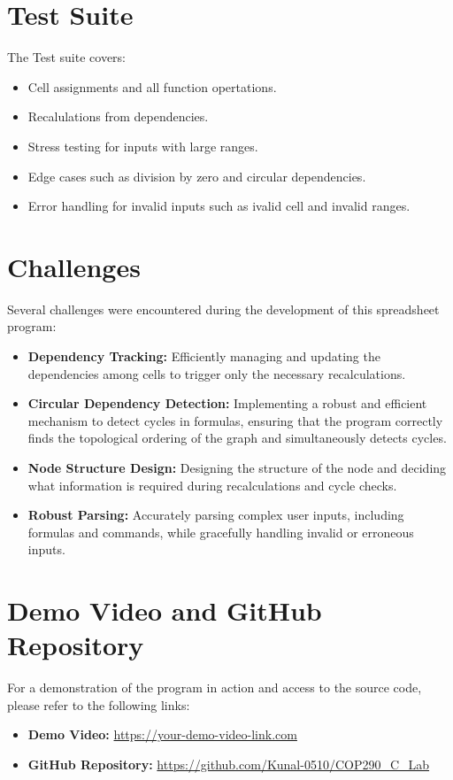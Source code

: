 \documentclass[a4paper,12pt,oneside]{article}
\begin{document}
\section{Test Suite}
The Test suite covers:
\begin{itemize}
    \item Cell assignments and all function opertations.
    \item Recalulations from dependencies.
    \item Stress testing for inputs with large ranges.
    \item Edge cases such as division by zero and circular dependencies.
    \item Error handling for invalid inputs such as ivalid cell and invalid ranges.
\end{itemize}


\section{Challenges}
Several challenges were encountered during the development of this spreadsheet program:
\begin{itemize}
    \item \textbf{Dependency Tracking:} Efficiently managing and updating the dependencies among cells to trigger only the necessary recalculations.
    \item \textbf{Circular Dependency Detection:} Implementing a robust and efficient mechanism to detect cycles in formulas, ensuring that the program correctly finds the topological ordering of the graph and simultaneously detects cycles.
    \item \textbf{Node Structure Design:} Designing the structure of the node and deciding what information is required during recalculations and cycle checks.
    \item \textbf{Robust Parsing:} Accurately parsing complex user inputs, including formulas and commands, while gracefully handling invalid or erroneous inputs.
\end{itemize}

\section{Demo Video and GitHub Repository}
For a demonstration of the program in action and access to the source code, please refer to the following links:
\begin{itemize}
    \item \textbf{Demo Video:} \url{https://your-demo-video-link.com}
    \item \textbf{GitHub Repository:} \url{https://github.com/Kunal-0510/COP290_C_Lab}
\end{itemize}
\end{document}
